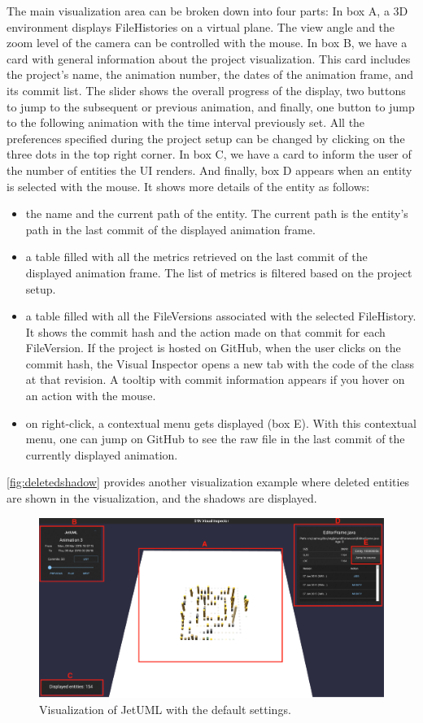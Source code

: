 The main visualization area can be broken down into four parts: 
In box A, a 3D environment displays FileHistories on a virtual plane. The view angle and the zoom level of the camera can be controlled with the mouse. 
In box B, we have a card with general information about the project visualization. 
This card includes the project's name, the animation number, the dates of the animation frame, and its commit list. The slider shows the overall progress of the display, two buttons to jump to the subsequent or previous animation, and finally, one button to jump to the following animation with the time interval previously set. 
All the preferences specified during the project setup can be changed by clicking on the three dots in the top right corner.
In box C, we have a card to inform the user of the number of entities the UI renders. 
And finally, box D appears when an entity is selected with the mouse. 
It shows more details of the entity as follows:
\begin{itemize}
    \item the name and the current path of the entity. The current path is the entity's path in the last commit of the displayed animation frame. 
    \item a table filled with all the metrics retrieved on the last commit of the displayed animation frame. The list of metrics is filtered based on the project setup. 
    \item a table filled with all the FileVersions associated with the selected FileHistory. It shows the commit hash and the action made on that commit for each FileVersion. If the project is hosted on GitHub, when the user clicks on the commit hash, the Visual Inspector opens a new tab with the code of the class at that revision. A tooltip with commit information appears if you hover on an action with the mouse. 
    \item on right-click, a contextual menu gets displayed (box E). With this contextual menu, one can jump on GitHub to see the raw file in the last commit of the currently displayed animation. 
\end{itemize}

\autoref{fig:deletedshadow} provides another visualization example where deleted entities are shown in the visualization, and the shadows are displayed. 

\begin{figure}
    \center
    \includegraphics[width=\textwidth]{SYNUI-fileHistory2.png}
    \caption{Visualization of JetUML with the default settings.}
    \label{fig:fileHistories}
\end{figure}

